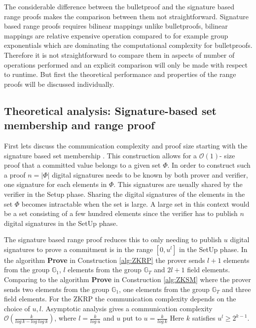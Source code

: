 The considerable difference between the bulletproof and the signature based range proofs makes the comparison between them not straightforward.  Signature based range proofs requires bilinear mappings unlike bulletproofs, bilinear mappings are relative expensive operation compared to for example group exponentials which are dominating  the computational complexity for bulletproofs. Therefore it is not straightforward to compare them in aspects of number of operations performed and an explicit comparison will only be made with respect to runtime. But first the theoretical performance  and properties of the range proofs will be discussed individually.

\subsection{Theoretical analysis: Signature-based set membership and range proof}

First lets discuss the communication complexity and proof size starting with the signature based set membership . This construction allows for a $\mathcal{O}(1)$- size proof that a committed value belongs to a given set $\Phi$. In order to construct such a proof $n=|\Phi|$ digital signatures needs to be known by both prover and verifier, one signature for each elements in $\Phi$. This signatures are usually shared by the verifier in the Setup phase. Sharing the digital signatures of the elements in the set $\Phi$ becomes intractable when the set is large.  A large set in this context would be a set consisting of a few hundred elements since the verifier has to publish $n$ digital signatures in the SetUp phase. 

The signature based range proof reduces this to only needing to publish $u$ digital signatures to prove a commitment is in the range $[0,u^l]$ in the SetUp phase. In the algorithm \textbf{Prove} in Construction \ref{alg:ZKRP} the prover sends $l+1$ elements from the group $\mathds{G}_1$, $l$ elements from the group $\mathds{G}_T$ and $2l+1$ field elements. Comparing to the algorithm \textbf{Prove} in Construction \ref{alg:ZKSM} where the prover sends two elements from the group $\mathds{G}_1$, one elements from the group $\mathds{G}_T$ and three field elements. For the ZKRP the communication complexity depends on the choice of $u,l$. Asymptotic analysis gives a communication complexity $\mathcal{O}(\frac{k}{log\:k-log\:log\:k})$, where $l=\frac{k}{log\:u}$ and $u$ put to $u=\frac{k}{log\: k}$ Here $k$ satisfies $u^l \geq 2^{k-1}$.

